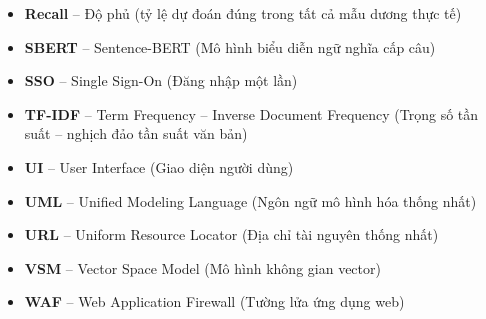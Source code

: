 \begin{itemize}
    \item \textbf{Recall} -- Độ phủ (tỷ lệ dự đoán đúng trong tất cả mẫu dương thực tế)
    \item \textbf{SBERT} -- Sentence-BERT (Mô hình biểu diễn ngữ nghĩa cấp câu)
    \item \textbf{SSO} -- Single Sign-On (Đăng nhập một lần)
    \item \textbf{TF-IDF} -- Term Frequency -- Inverse Document Frequency (Trọng số tần suất -- nghịch đảo tần suất văn bản)
    \item \textbf{UI} -- User Interface (Giao diện người dùng)
    \item \textbf{UML} -- Unified Modeling Language (Ngôn ngữ mô hình hóa thống nhất)
    \item \textbf{URL} -- Uniform Resource Locator (Địa chỉ tài nguyên thống nhất)
    \item \textbf{VSM} -- Vector Space Model (Mô hình không gian vector)
    \item \textbf{WAF} -- Web Application Firewall (Tường lửa ứng dụng web)
\end{itemize}
